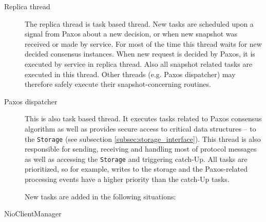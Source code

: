 \begin{description}
  \item[Replica thread] \hfill

    The replica thread is task based thread. New tasks are scheduled upon a signal from Paxos about a new decision, or when new snapshot was received or made by service. For most of the time this thread waits for new decided consensus instances. When new request is decided by Paxos, it is executed by service in replica thread. Also all snapshot related tasks are executed in this thread. Other threads (e.g. Paxos dispatcher) may therefore safely execute their snapshot-concerning routines.
    
  \item[Paxos dispatcher] \hfill \nopagebreak
    
    This is also task based thread. It executes tasks related to Paxos consensus algorithm as well as provides secure access to critical data structures -- to the \texttt{Storage} (see subsection \ref{subsec:storage_interface}). This thread is also responsible for sending, receiving and handling most of protocol messages as well as accessing the \texttt{Storage} and triggering catch-Up. All tasks are prioritized, so for example, writes to the storage and the Paxos-related processing events have a higher priority than the catch-Up tasks.
    
    New tasks are added in the following situations:
    
  \item[NioClientManager] \hfill


\end{description}
